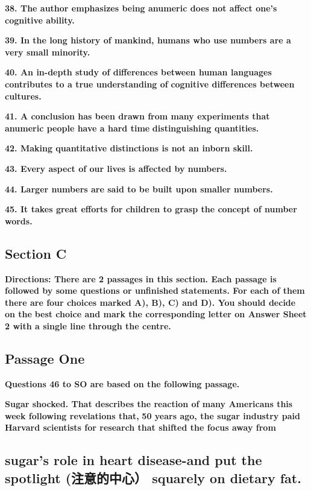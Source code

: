 \documentclass[UTF8,11pt]{ctexart}
\begin{document}
\textbf{38. The author emphasizes being anumeric does not affect one's cognitive ability.}


\textbf{39. In the long history of mankind, humans who use numbers are a very small minority.}


\textbf{40. An in-depth study of differences between human languages contributes to a true understanding of} \textbf{cognitive differences between cultures.}


\textbf{41. A conclusion has been drawn from many experiments that anumeric people have a hard time} \textbf{distinguishing quantities.}


\textbf{42. Making quantitative distinctions is not an inborn skill.}


\textbf{43. Every aspect of our lives is affected by numbers.}


\textbf{44. Larger numbers are said to be built upon smaller numbers.}


\textbf{45. It takes great efforts for children to grasp the concept of number words.}


\subsection*{\textbf{Section} C}


\textbf{Directions: There are 2 passages in this section. Each passage is followed by some questions or unfinished} \textbf{statements. For each of them there are four choices marked A), B), C) and D). You should decide on the} \textbf{best choice and mark the corresponding letter on Answer Sheet 2 with a single line through the centre.}


\subsection*{\textbf{Passage One}}


\textbf{Questions 46 to SO are based on the following passage.}


\textbf{Sugar shocked. That describes the reaction of many Americans this week following revelations that,} \textbf{50 years ago, the sugar industry paid Harvard scientists for research that shifted the focus away from}


\subsection*{\textbf{sugar's role in heart disease-and put the spotlight (注意的中心） squarely on dietary fat.}}
\end{document}
